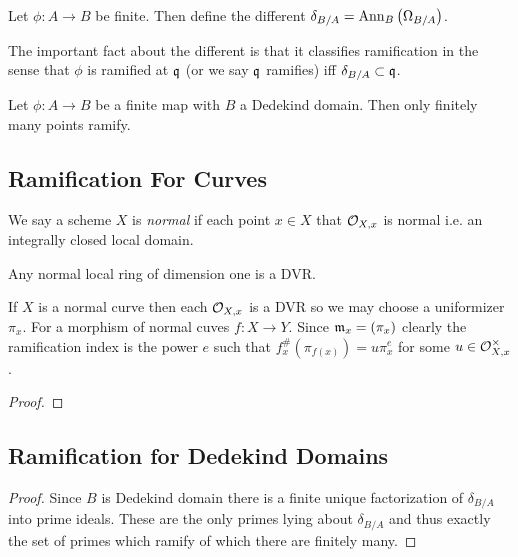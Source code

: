 \documentclass[12pt]{article}
\begin{document}
\begin{definition}
Let $\phi : A \to B$ be finite. Then define the different $\delta_{B/A} = \mathrm{Ann}_{B}\left(\Omega_{B/A}\right)$. 
\end{definition}

\begin{remark}
The important fact about the different is that it classifies ramification in the sense that $\phi$ is ramified at $\mathfrak{q}$ (or we say $\mathfrak{q}$ ramifies) iff $\delta_{B/A} \subset \mathfrak{q}$. 
\end{remark}

\begin{corollary}
Let $\phi : A \to B$ be a finite map with $B$ a Dedekind domain. Then only finitely many points ramify.
\end{corollary}


\subsection{Ramification For Curves}

\begin{definition}
We say a scheme $X$ is \textit{normal} if each point $x \in X$ that $\mathcal{O}_{X, x}$ is normal i.e. an integrally closed local domain. 
\end{definition}

\begin{lemma}
Any normal local ring of dimension one is a DVR.
\end{lemma}

\begin{definition}
If $X$ is a normal curve then each $\mathcal{O}_{X, x}$ is a DVR so we may choose a uniformizer $\pi_x$. For a morphism of normal cuves $f : X \to Y$. Since $\mathfrak{m}_x = (\pi_x)$ clearly the ramification index is the power $e$ such that $f^\#_{x}(\pi_{f(x)}) = u \pi_x^e$ for some $u \in \mathcal{O}_{X, x}^\times$. 
\end{definition}

\begin{proof}

\end{proof}

\subsection{Ramification for Dedekind Domains}

\begin{proof}
Since $B$ is Dedekind domain there is a finite unique factorization of $\delta_{B / A}$ into prime ideals. These are the only primes lying about $\delta_{B/A}$ and thus exactly the set of primes which ramify of which there are finitely many.  
\end{proof}
\end{document}
